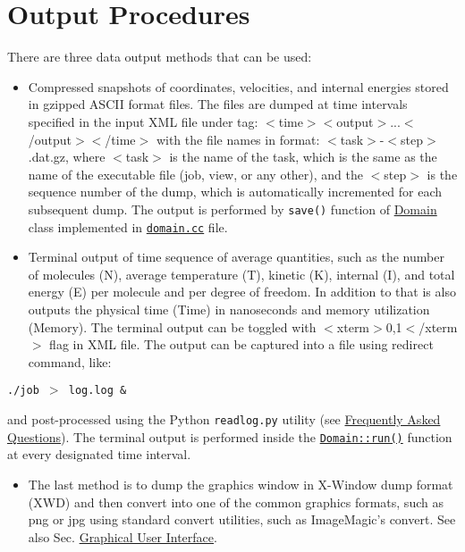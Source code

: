 \hypertarget{Output_SecOutput}{}\section{Output Procedures}\label{Output_SecOutput}
There are three data output methods that can be used:

\begin{itemize}
\item Compressed snapshots of coordinates, velocities, and internal energies stored in gzipped ASCII format files. The files are dumped at time intervals specified in the input XML file under tag: $<$time$>$$<$output$>$...$<$/output$>$$<$/time$>$ with the file names in format: $<$task$>$-$<$step$>$.dat.gz, where $<$task$>$ is the name of the task, which is the same as the name of the executable file (job, view, or any other), and the $<$step$>$ is the sequence number of the dump, which is automatically incremented for each subsequent dump. The output is performed by {\tt save()} function of \hyperlink{classDomain}{Domain} class implemented in {\tt \hyperlink{domain_8cc}{domain.cc}} file.\end{itemize}


\begin{itemize}
\item Terminal output of time sequence of average quantities, such as the number of molecules (N), average temperature (T), kinetic (K), internal (I), and total energy (E) per molecule and per degree of freedom. In addition to that is also outputs the physical time (Time) in nanoseconds and memory utilization (Memory). The terminal output can be toggled with $<$xterm$>$0,1$<$/xterm$>$ flag in XML file. The output can be captured into a file using redirect command, like:\end{itemize}


{\tt ./job $>$ log.log \&}

and post-processed using the Python {\tt readlog.py} utility (see \hyperlink{FAQ}{Frequently Asked Questions}). The terminal output is performed inside the {\tt \hyperlink{classDomain_b5cc49686f4e35fb6deb30bdfeb906e0}{Domain::run()}} function at every designated time interval.

\begin{itemize}
\item The last method is to dump the graphics window in X-Window dump format (XWD) and then convert into one of the common graphics formats, such as png or jpg using standard convert utilities, such as ImageMagic's convert. See also Sec. \hyperlink{GUI_SecGUI}{Graphical User Interface}. \end{itemize}
